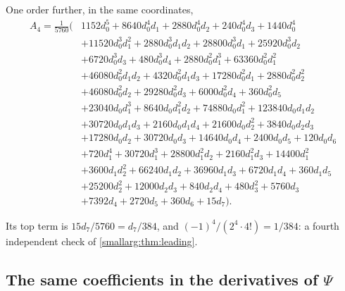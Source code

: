 \documentclass[11pt,oneside]{article}
\theoremstyle{definition}
\theoremstyle{remark}
\begin{document}
One order further, in the same coordinates,
\begin{equation}\label{smallarg:eq:A4jets}
\begin{aligned}
  A_4=\frac{1}{5760}\bigl(&1152d_0^5+8640d_0^4d_1+2880d_0^4d_2+240d_0^4d_3+1440d_0^4\\
   &+11520d_0^3d_1^2+2880d_0^3d_1d_2+28800d_0^3d_1+25920d_0^3d_2\\
   &+6720d_0^3d_3+480d_0^3d_4+2880d_0^2d_1^3+63360d_0^2d_1^2\\
   &+46080d_0^2d_1d_2+4320d_0^2d_1d_3+17280d_0^2d_1+2880d_0^2d_2^2\\
   &+46080d_0^2d_2+29280d_0^2d_3+6000d_0^2d_4+360d_0^2d_5\\
   &+23040d_0d_1^3+8640d_0d_1^2d_2+74880d_0d_1^2+123840d_0d_1d_2\\
   &+30720d_0d_1d_3+2160d_0d_1d_4+21600d_0d_2^2+3840d_0d_2d_3\\
   &+17280d_0d_2+30720d_0d_3+14640d_0d_4+2400d_0d_5+120d_0d_6\\
   &+720d_1^4+30720d_1^3+28800d_1^2d_2+2160d_1^2d_3+14400d_1^2\\
   &+3600d_1d_2^2+66240d_1d_2+36960d_1d_3+6720d_1d_4+360d_1d_5\\
   &+25200d_2^2+12000d_2d_3+840d_2d_4+480d_3^2+5760d_3\\
   &+7392d_4+2720d_5+360d_6+15d_7\bigr).
\end{aligned}
\end{equation}

Its top term is $15d_7/5760=d_7/384$, and $(-1)^4/(2^4\cdot4!)=1/384$: a
fourth independent check of \cref{smallarg:thm:leading}.

\subsection{The same coefficients in the derivatives of \texorpdfstring{$\Psi$}{Psi}}
\end{document}
